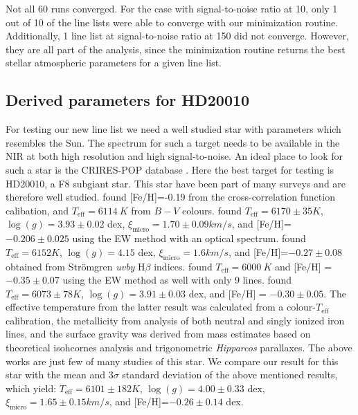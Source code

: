 \documentclass{aa}
\begin{document}
Not all 60 runs converged. For the case with signal-to-noise ratio at
10, only 1 out of 10 of the line lists were able to converge with our
minimization routine. Additionally, 1 line list at signal-to-noise ratio
at 150 did not converge. However, they are all part of the analysis,
since the minimization routine returns the best stellar atmospheric
parameters for a given line list.




\subsection{Derived parameters for HD20010}
\label{sec:derived_parameters_of_hd20010}

For testing our new line list we need a well studied star with
parameters which resembles the Sun. The spectrum for such a target
needs to be available in the NIR at both high resolution and high
signal-to-noise. An ideal place to look for such a star is the
CRIRES-POP database \citep{Lebzelter2012}. Here the best target for
testing is HD20010, a F8 subgiant star. This star have been part of
many surveys and are therefore well studied. \cite{Mortier2013} found
[Fe/H]=-0.19 from the cross-correlation function calibation, and
$T_\mathrm{eff}=\SI{6114}{K}$ from $B-V$ colours. \cite{Gonzalez2010}
found $T_\mathrm{eff} = 6170\pm35\si{K}$, $\log(g) = 3.93\pm0.02$ dex,
$\xi_\mathrm{micro} = 1.70\pm0.09\si{km/s}$, and [Fe/H]=$-0.206\pm0.025$
using the EW method with an optical spectrum. \cite{Balachandran1990}
found $T_\mathrm{eff} = 6152\si{K}$, $\log(g) = 4.15$ dex,
$\xi_\mathrm{micro} = 1.6\si{km/s}$, and [Fe/H]=$-0.27\pm0.08$ obtained
from Str\"{o}mgren \emph{uvby} H$\beta$ indices. \cite{Favata1997} found
$T_\mathrm{eff}=\SI{6000}{K}$ and [Fe/H] = $-0.35\pm0.07$ using the EW
method as well with only 9 lines. \cite{Ramirez2012} found $T_\mathrm{eff}
= 6073\pm78\si{K}$, $\log(g) = 3.91\pm0.03$ dex, and [Fe/H] =
$-0.30\pm0.05$. The effective temperature from the latter result was
calculated from a colour-$T_\mathrm{eff}$ calibration, the metallicity
from analysis of both neutral and singly ionized iron lines, and the
surface gravity was derived from mass estimates based on theoretical
isohcornes analysis and trigonometric \emph{Hipparcos} parallaxes. The
above works are just few of many studies of this star. We compare our
result for this star with the mean and $3 \sigma$ standard deviation of
the above mentioned results, which yield: $T_\mathrm{eff} = 6101\pm182\si{K}$,
$\log(g) = 4.00\pm0.33$ dex, $\xi_\mathrm{micro} = 1.65\pm0.15\si{km/s}$, and
[Fe/H]=$-0.26\pm0.14$ dex.
\end{document}
